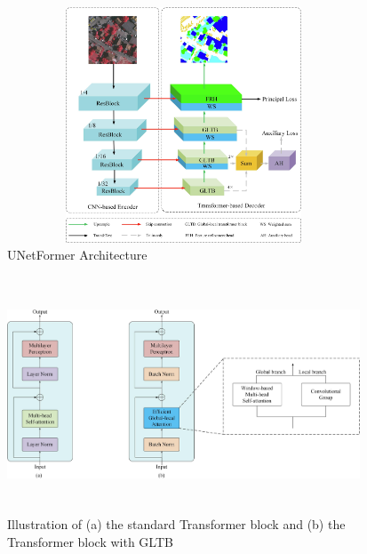 \FloatBarrier
\begin{figure}[ht]
\includegraphics[width=10.5cm, height=7cm]{images/unetformer.jpg}
\centering
\caption{UNetFormer Architecture \protect\cite{unetformer}}
\label{fig:unetformer}
\end{figure}
\begin{figure}[ht]
\includegraphics[width=10.5cm, height=7cm]{images/gltb.jpg}
\centering
\caption{ Illustration of (a) the standard Transformer block and (b) the Transformer block with GLTB \protect\cite{unetformer}}
\label{fig:gltb}
\end{figure}

